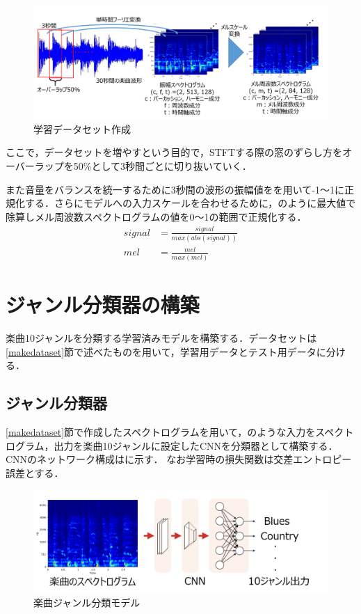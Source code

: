 \begin{figure}[htbp]
	\begin{center}
		\includegraphics[scale=0.7]{./images/dataset/makedataset.png}
		\caption{学習データセット作成}
		\label{fig:makedataset}
	\end{center}
\end{figure}
ここで，データセットを増やすという目的で，STFTする際の窓のずらし方をオーバーラップを50\%として3秒間ごとに切り抜いていく．

また音量をバランスを統一するために3秒間の波形の振幅値をを用いて-1～1に正規化する．さらにモデルへの入力スケールを合わせるために，のように最大値で除算しメル周波数スペクトログラムの値を0～1の範囲で正規化する．
\begin{align}
	signal &= \frac{signal}{max(abs(signal))} \label{eq:normalize-sig}\\
	mel &= \frac{mel}{max(mel)}　\label{eq:normalize-mel}
\end{align}


\clearpage
\section{ジャンル分類器の構築} \label{classify-model}
楽曲10ジャンルを分類する学習済みモデルを構築する．データセットは\ref{makedataset}節で述べたものを用いて，学習用データとテスト用データに分ける．

\subsection{ジャンル分類器}
\ref{makedataset}節で作成したスペクトログラムを用いて，のような入力をスペクトログラム，出力を楽曲10ジャンルに設定したCNNを分類器として構築する．CNNのネットワーク構成はに示す．
なお学習時の損失関数は交差エントロピー誤差とする．
\begin{figure}[htbp]
	\begin{center}
		\includegraphics[scale=0.7]{./images/classify-model/proposedCNN.png}
		\caption{楽曲ジャンル分類モデル}
		\label{fig:proposedCNN}
	\end{center}
\end{figure}

